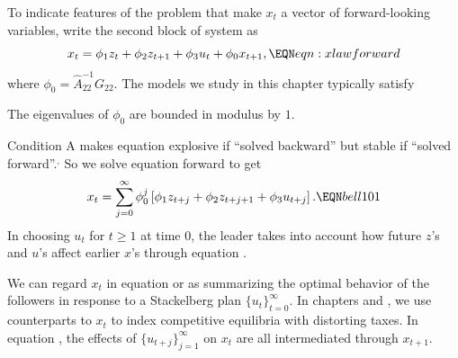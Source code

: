 To indicate features of the problem that make $x_t$ a vector of forward-looking
variables, write the second block of system 
as
$$ x_t =  \phi_1 z_t + \phi_2 z_{t+1} +  \phi_3 u_t + \phi_0 x_{t+1} , \EQN eqn:xlawforward $$
where $\phi_0 = \hat A_{22}^{-1} G_{22}$.
The models we study in this chapter typically satisfy

The eigenvalues of $\phi_0$ %
are bounded in modulus by $1$. %

\medskip

\noindent Condition A makes equation  explosive if ``solved backward'' but stable if ``solved forward''.$^,$ So we solve
equation  forward to get
$$ x_t = \sum_{j=0}^\infty \phi_0^j \left[ \phi_1 z_{t+j} + \phi_2 z_{t+j+1} + \phi_3 u_{t+j} \right] . \EQN bell101 $$
In choosing $u_t$ for $t \geq 1$ at time $0$, the leader  takes into account how future $z$'s and $u$'s affect earlier
$x$'s through equation .




%

We can regard $x_t$ in equation  or  as summarizing the optimal behavior of the followers
in response to a Stackelberg plan $\{u_t\}_{t=0}^\infty$.  In chapters  and  , we use counterparts to $x_t$ to index
competitive equilibria with distorting taxes.  In equation , the effects of $\{u_{t+j}\}_{j=1}^\infty$ on $x_t$ are all
 intermediated through $x_{t+1}$.


